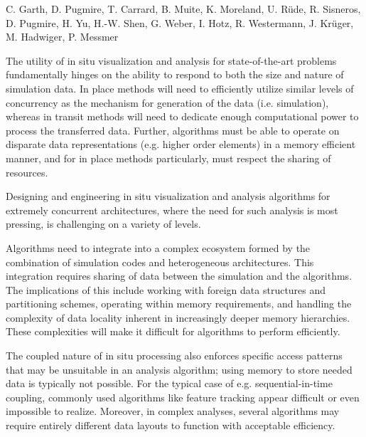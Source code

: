 
\license

 C. Garth, D. Pugmire, T. Carrard, B. Muite, K. Moreland, U. Rüde, R. Sisneros, D. Pugmire, H. Yu, H.-W. Shen, G. Weber, I. Hotz, R. Westermann, J. Krüger, M. Hadwiger, P. Messmer

\begin{refsection}

The utility of in situ visualization and analysis for state-of-the-art problems fundamentally hinges on the ability to respond to both the size and nature of simulation data. In place methods will need to efficiently utilize similar levels of concurrency as the mechanism for generation of the data (i.e. simulation), whereas in transit methods will need to dedicate enough computational power to process the transferred data.  Further, algorithms must be able to operate on disparate data representations (e.g. higher order elements) in a memory efficient manner, and for in place methods particularly, must respect the sharing of resources.

Designing and engineering in situ visualization and analysis algorithms for extremely concurrent architectures, where the need for such analysis is most pressing, is challenging on a variety of levels.

Algorithms need to integrate into a complex ecosystem formed by the combination of simulation codes and heterogeneous architectures. This integration requires sharing of data between the simulation and the algorithms. The implications of this include working with foreign data structures and partitioning schemes, operating within memory requirements, and handling the complexity of data locality inherent in increasingly deeper memory hierarchies. These complexities will make it difficult for algorithms to perform efficiently.

The coupled nature of in situ processing also enforces specific access patterns that may be unsuitable in an analysis algorithm; using memory to store needed data is typically not possible. For the typical case of e.g. sequential-in-time coupling, commonly used algorithms like feature tracking appear difficult or even impossible to realize. Moreover, in complex analyses, several algorithms may require entirely different data layouts to function with acceptable efficiency.


\end{refsection}
